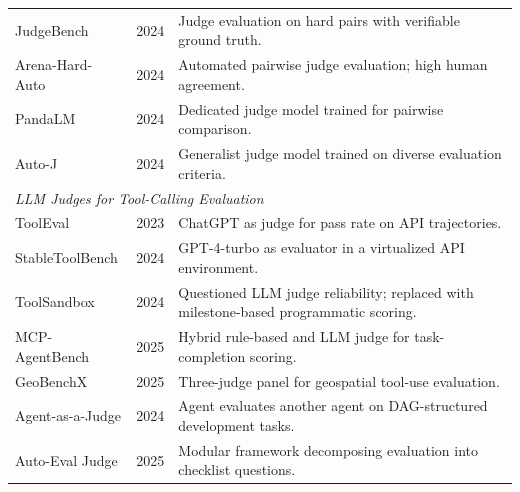 \begin{table}[!htbp]
\begin{tabularx}{\textwidth}{l l X}
JudgeBench \cite{tan2024judgebench} & 2024 & Judge evaluation on hard pairs with verifiable ground truth. \\
Arena-Hard-Auto \cite{li2024arenahard} & 2024 & Automated pairwise judge evaluation; high human agreement. \\
PandaLM \cite{wang2024pandalm} & 2024 & Dedicated judge model trained for pairwise comparison. \\
Auto-J \cite{li2024autoj} & 2024 & Generalist judge model trained on diverse evaluation criteria. \\
\midrule
\multicolumn{3}{l}{\textit{LLM Judges for Tool-Calling Evaluation}} \\
\midrule
ToolEval \cite{qin2023toolllm} & 2023 & ChatGPT as judge for pass rate on API trajectories. \\
StableToolBench \cite{guo2024stabletoolbench} & 2024 & GPT-4-turbo as evaluator in a virtualized API environment. \\
ToolSandbox \cite{lu2024toolsandbox} & 2024 & Questioned LLM judge reliability; replaced with milestone-based programmatic scoring. \\
MCP-AgentBench \cite{mcpagentbench2025} & 2025 & Hybrid rule-based and LLM judge for task-completion scoring. \\
GeoBenchX \cite{krechetova2025geobenchx} & 2025 & Three-judge panel for geospatial tool-use evaluation. \\
Agent-as-a-Judge \cite{zhuge2024agentjudge} & 2024 & Agent evaluates another agent on DAG-structured development tasks. \\
Auto-Eval Judge \cite{bhonsle2025autoeval} & 2025 & Modular framework decomposing evaluation into checklist questions. \\
\bottomrule

\end{tabularx}
\end{table}